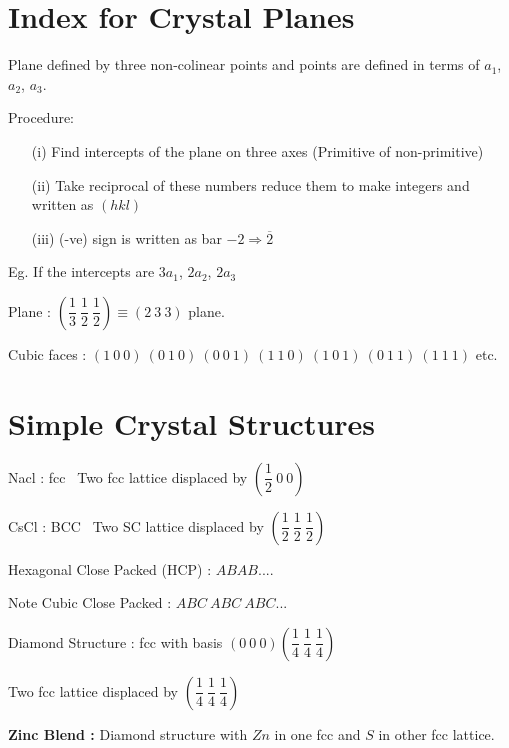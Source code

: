 \section*{Index for Crystal Planes}

Plane defined by three non-colinear points and points are defined in terms of $a_{1}$, $a_{2}$, $a_{3}$.

Procedure:
\begin{itemize}
\item[(i)] Find intercepts of the plane on three axes (Primitive of non-primitive)

\item[(ii)] Take reciprocal of these numbers reduce them to make integers and written as $(hkl)$

\item[(iii)] (-ve) sign is written as bar $-2\Rightarrow \overline{2}$
\end{itemize}
Eg. If the intercepts are $3a_{1}$, $2a_{2}$, $2a_{3}$

\smallskip
Plane : $\left(\dfrac{1}{3} \ \dfrac{1}{2} \ \dfrac{1}{2}\right)\equiv (2 \ 3 \ 3)$ plane.

\smallskip
Cubic faces : $(1 \ 0 \ 0) \ (0 \ 1 \ 0) \ (0 \ 0 \ 1) \ (1 \ 1 \ 0) \ (1 \ 0 \ 1) \ (0 \ 1 \ 1) \ (1 \ 1 \ 1)$ etc.

\section*{Simple Crystal Structures}

Nacl : fcc \ Two fcc lattice displaced by $\left(\dfrac{1}{2} \ 0 \ 0\right)$

\medskip
\noindent
CsCl : BCC \ Two SC lattice displaced by $\left(\dfrac{1}{2} \ \dfrac{1}{2} \ \dfrac{1}{2}\right)$

\medskip
\noindent
Hexagonal Close Packed (HCP) : $ABAB....$

\medskip
\noindent
Note Cubic Close Packed : $ABC \ ABC \ ABC...$

\medskip
\noindent
Diamond Structure : fcc with basis $(0 \ 0 \ 0) \left(\dfrac{1}{4} \ \dfrac{1}{4} \ \dfrac{1}{4}\right)$

\medskip
{}

\medskip
\noindent
Two fcc lattice displaced by $\left(\dfrac{1}{4} \ \dfrac{1}{4} \ \dfrac{1}{4}\right)$

\medskip
\noindent
{\bf Zinc Blend :} Diamond structure with $Zn$ in one fcc and $S$ in other fcc lattice.

